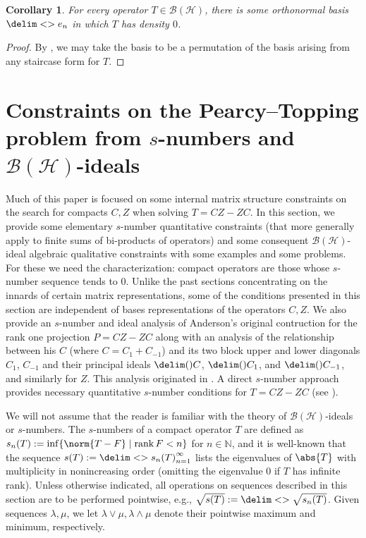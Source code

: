 \documentclass[10pt,reqno]{amsart}
\newtheorem{corollary}[theorem]{Corollary}
\theoremstyle{remark}
\newcommand{\BH}{\mathcal{B}(\Hil)}
\newcommand{\Hil}{\mathcal{H}}
\DeclareMathOperator{\rank}{rank}
\newcommand{\seq}{\delim<>}
\newcommand{\ideal}{\delim()}
\numberwithin{equation}{section}
\begin{document}
\begin{corollary}
  \label{cor:all-density-zero}
  For every operator $T\in\BH$, there is some orthonormal basis $\seq{e_n}$ in which $T$ has density $0$.
\end{corollary}

\begin{proof}
  By , we may take the basis to be a permutation of the basis arising from any staircase form for $T$.
\end{proof}


\section{Constraints on the Pearcy--Topping problem from $s$-numbers and $\BH$-ideals}
\label{sec6}

Much of this paper is focused on some internal matrix structure constraints on the search for compacts $C,Z$ when solving $T = CZ-ZC$.
In this section, we provide some elementary $s$-number quantitative constraints (that more generally  apply to finite sums of bi-products of operators) and some consequent $\BH$-ideal algebraic qualitative constraints with some examples and some problems.
For these we need the characterization: compact operators are those whose $s$-number sequence tends to 0.
Unlike the past sections concentrating on the innards of certain matrix representations, some of the conditions presented in this section are independent of bases representations of the operators $C,Z$.
We also provide an $s$-number and ideal analysis of Anderson's original contruction for the rank one projection $P = CZ-ZC$ along with an analysis of the relationship between his $C$ (where $C = C_1 + C_{-1}$) and its two block upper and lower diagonals $C_1$, $C_{-1}$ and their principal ideals $\ideal{C}$, $\ideal{C_{1}}$, and $\ideal{C_{-1}}$, and similarly for $Z$.
This analysis originated in \cite{LW-2021-OM}.
A direct $s$-number approach provides necessary quantitative $s$-number conditions for $T = CZ-ZC$ (see ).

We will not assume that the reader is familiar with the theory of $\BH$-ideals or $s$-numbers.
The $s$-numbers of a compact operator $T$ are defined as $s_n(T) := \inf\{\norm{T-F} \mid \rank F < n\}$ for $n \in \mathbb{N}$, and it is well-known that the sequence $s(T) := \seq{s_n(T)}_{n=1}^{\infty}$ lists the eigenvalues of $\abs{T}$ with multiplicity in nonincreasing order (omitting the eigenvalue $0$ if $T$ has infinite rank).
Unless otherwise indicated, all operations on sequences described in this section are to be performed pointwise, e.g., $\sqrt{s(T)} := \seq{\sqrt{s_n(T)}}$.
Given sequences $\lambda,\mu$, we let $\lambda \vee \mu, \lambda \wedge \mu$ denote their pointwise maximum and minimum, respectively.
\end{document}
